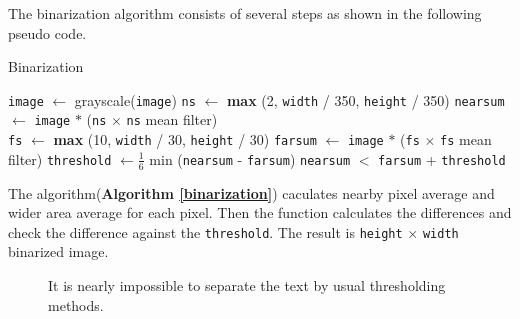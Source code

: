 \documentclass[10pt,twocolumn,letterpaper]{article}
\begin{document}
The binarization algorithm consists of several steps as shown in the following pseudo code.

\begin{algorithm}
\caption{Binarization} \label{binarization}
\begin{algorithmic}[1]
\State \texttt{image} $\gets$ grayscale(\texttt{image})
\State \texttt{ns} $\gets$ \textbf{max} (2, \texttt{width} / 350, \texttt{height} / 350)
\State \texttt{nearsum} $\gets$ \texttt{image} $\ast$ (\texttt{ns} $\times$ \texttt{ns} mean filter) \\
\State \texttt{fs} $\gets$ \textbf{max} (10, \texttt{width} / 30, \texttt{height} / 30)
\State \texttt{farsum} $\gets$ \texttt{image} $\ast$ (\texttt{fs} $\times$ \texttt{fs} mean filter)
\State \texttt{threshold} $\gets \frac{1}{6}$ min (\texttt{nearsum} - \texttt{farsum})
\State \Return \texttt{nearsum} $<$ \texttt{farsum} + \texttt{threshold}
\EndFunction
\end{algorithmic}
\end{algorithm}

The algorithm(\textbf{Algorithm \ref{binarization}}) caculates nearby pixel average and wider area average for each pixel.
Then the function calculates the differences and check the difference against the \texttt{threshold}.
The result is \texttt{height} $\times$ \texttt{width} binarized image.

\begin{figure}[t]
\begin{center}
\end{center}
   \caption{It is nearly impossible to separate the text by usual thresholding methods. }
\label{fig:thresholding}
\end{figure}
\end{document}
